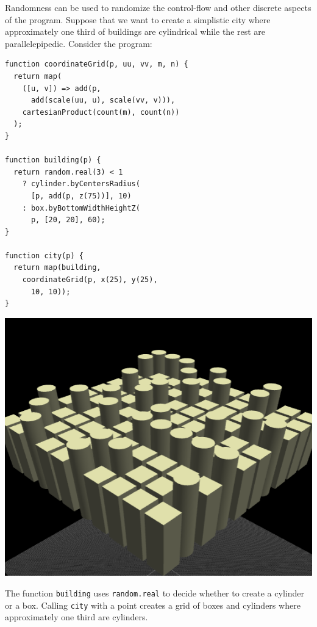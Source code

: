 Randomness can be used to randomize the control-flow and other discrete aspects of the program.
Suppose that we want to create a simplistic city where approximately one third of buildings are cylindrical while the rest are parallelepipedic.
Consider the program:

\noindent
\begin{minipage}{1.0\textwidth}
\begin{minipage}{0.5\textwidth}
\begin{verbatim}
function coordinateGrid(p, uu, vv, m, n) {
  return map(
    ([u, v]) => add(p,
      add(scale(uu, u), scale(vv, v))),
    cartesianProduct(count(m), count(n))
  );
}

function building(p) {
  return random.real(3) < 1
    ? cylinder.byCentersRadius(
      [p, add(p, z(75))], 10)
    : box.byBottomWidthHeightZ(
      p, [20, 20], 60);
}

function city(p) {
  return map(building,
    coordinateGrid(p, x(25), y(25),
      10, 10));
}
\end{verbatim}
\end{minipage}%
\begin{minipage}{0.5\textwidth}
  \includegraphics[width=1.0\textwidth]{./images/detail_examples/box_cyl_city_crop}
\end{minipage}
\end{minipage}

The function {\tt building} uses {\tt random.real} to decide whether to create a cylinder or a box.
Calling {\tt city} with a point creates a grid of boxes and cylinders where approximately one third are cylinders.


